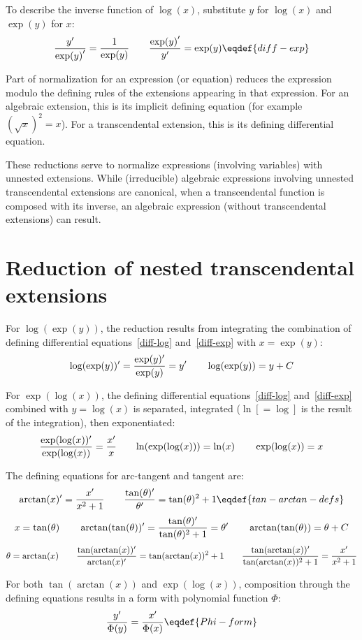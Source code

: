 To describe the inverse function of $\log(x)$, substitute $y$ for
$\log(x)$ and $\exp(y)$ for $x$:
$${{y}'\over {\exp(y)}'}={1\over\exp(y)}\qquad{{\exp(y)}'\over {y}'}=\exp(y)\eqdef{diff-exp}$$

Part of normalization for an expression (or equation) reduces the
expression modulo the defining rules of the extensions appearing in
that expression.  For an algebraic extension, this is its implicit
defining equation (for example $(\sqrt{x})^2=x$).  For a
transcendental extension, this is its defining differential equation.

These reductions serve to normalize expressions (involving variables)
with unnested extensions.  While (irreducible) algebraic expressions
involving unnested transcendental extensions are canonical, when a
transcendental function is composed with its inverse, an algebraic
expression (without transcendental extensions) can result.

\section{Reduction of nested transcendental extensions}

For $\log(\exp(y))$, the reduction results from integrating the
combination of defining differential equations~\eqref{diff-log}
and~\eqref{diff-exp} with $x=\exp(y)$:
$${\log(\exp(y))'}={\exp(y)'\over\exp(y)}=y'
 \qquad \log(\exp(y))=y+C$$

For $\exp(\log(x))$, the defining differential equations~\eqref{diff-log}
and~\eqref{diff-exp} combined with $y=\log(x)$ is separated, integrated
($\ln[=\log]$ is the result of the integration), then exponentiated:
$${\exp(\log(x))'\over\exp(\log(x))}={x'\over x}
 \qquad{\ln(\exp(\log(x)))}=\ln(x)
 \qquad \exp(\log(x))=x$$

The defining equations for arc-tangent and tangent are:
$$\arctan(x)'={x'\over x^2+1}\qquad
 {\tan(\theta)'\over\theta'}=\tan(\theta)^2+1\eqdef{tan-arctan-defs}$$
$$x=\tan(\theta)\qquad
 \arctan(\tan(\theta))'={\tan(\theta)'\over\tan(\theta)^2+1}=\theta'
 \qquad \arctan(\tan(\theta))=\theta+C$$
$$\theta=\arctan(x)\qquad
 {\tan(\arctan(x))'\over\arctan(x)'}=\tan(\arctan(x))^2+1
 \qquad{\tan(\arctan(x))'\over\tan(\arctan(x))^2+1}={x'\over x^2+1}$$

For both $\tan(\arctan(x))$ and $\exp(\log(x))$, composition through
the defining equations results in a form with polynomial function
$\Phi$:
$${y'\over\Phi(y)}={x'\over\Phi(x)}\eqdef{Phi-form}$$

